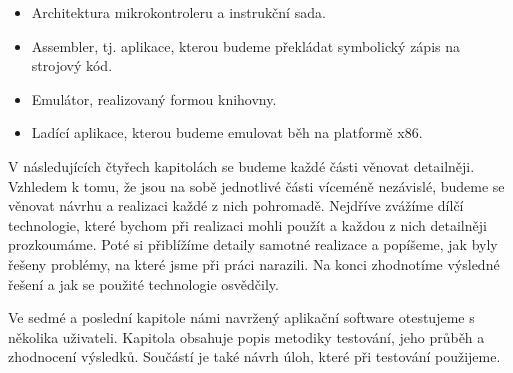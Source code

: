 \begin{introduction}
\begin{itemize}
	\item Architektura mikrokontroleru a instrukční sada.
	\item Assembler, tj. aplikace, kterou budeme překládat symbolický zápis na strojový kód.
	\item Emulátor, realizovaný formou knihovny.
	\item Ladící aplikace, kterou budeme emulovat běh na platformě x86.
\end{itemize}

V následujících čtyřech kapitolách se budeme každé části věnovat detailněji. Vzhledem k tomu, že jsou na sobě jednotlivé části víceméně nezávislé, budeme se věnovat návrhu a realizaci každé z nich pohromadě. Nejdříve zvážíme dílčí technologie, které bychom při realizaci mohli použít a každou z nich detailněji prozkoumáme. Poté si přiblížíme detaily samotné realizace a popíšeme, jak byly řešeny problémy, na které jsme při práci narazili. Na konci zhodnotíme výsledné řešení a jak se použité technologie osvědčily.

Ve sedmé a poslední kapitole námi navržený aplikační software otestujeme s několika uživateli. Kapitola obsahuje popis metodiky testování, jeho průběh a zhodnocení výsledků. Součástí je také návrh úloh, které při testování použijeme.

\end{introduction}
